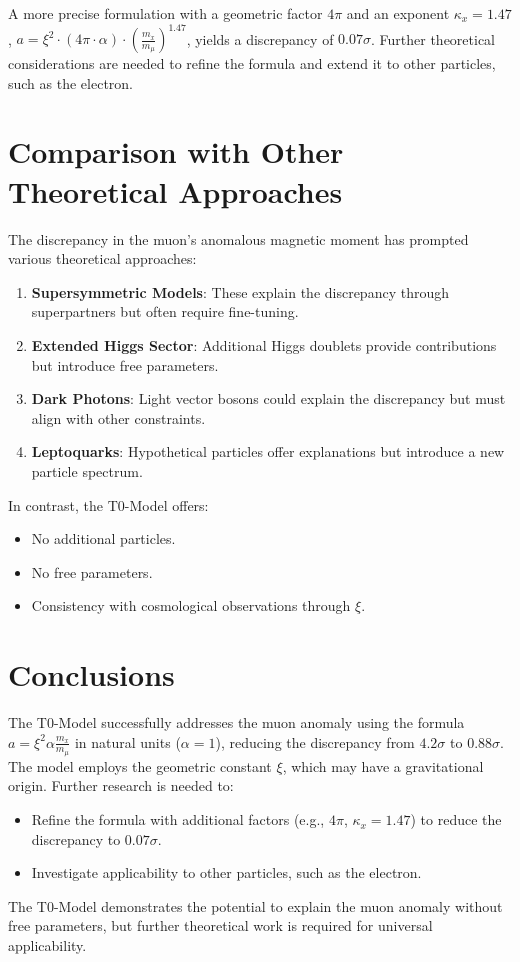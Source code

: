 \documentclass[12pt,a4paper]{article}
\newcommand{\xipar}{\xi}
\begin{document}
	\begin{caution}
		A more precise formulation with a geometric factor \(4\pi\) and an exponent \(\kappa_x = 1.47\), \(a = \xipar^2 \cdot (4\pi \cdot \alpha) \cdot \left(\frac{m_x}{m_\mu}\right)^{1.47}\), yields a discrepancy of \(0.07\sigma\). Further theoretical considerations are needed to refine the formula and extend it to other particles, such as the electron.
	\end{caution}
	
	\section{Comparison with Other Theoretical Approaches}
	
	The discrepancy in the muon's anomalous magnetic moment has prompted various theoretical approaches:
	\begin{enumerate}
		\item \textbf{Supersymmetric Models}: These explain the discrepancy through superpartners but often require fine-tuning.
		\item \textbf{Extended Higgs Sector}: Additional Higgs doublets provide contributions but introduce free parameters.
		\item \textbf{Dark Photons}: Light vector bosons could explain the discrepancy but must align with other constraints.
		\item \textbf{Leptoquarks}: Hypothetical particles offer explanations but introduce a new particle spectrum.
	\end{enumerate}
	In contrast, the T0-Model offers:
	\begin{itemize}
		\item No additional particles.
		\item No free parameters.
		\item Consistency with cosmological observations through \(\xipar\).
	\end{itemize}
	
	\section{Conclusions}
	
	The T0-Model successfully addresses the muon anomaly using the formula \(a = \xipar^2 \alpha \frac{m_x}{m_\mu}\) in natural units (\(\alpha = 1\)), reducing the discrepancy from \(4.2\sigma\) to \(0.88\sigma\). The model employs the geometric constant \(\xipar\), which may have a gravitational origin. Further research is needed to:
	\begin{itemize}
		\item Refine the formula with additional factors (e.g., \(4\pi\), \(\kappa_x = 1.47\)) to reduce the discrepancy to \(0.07\sigma\).
		\item Investigate applicability to other particles, such as the electron.
	\end{itemize}
	The T0-Model demonstrates the potential to explain the muon anomaly without free parameters, but further theoretical work is required for universal applicability.
	
\end{document}
